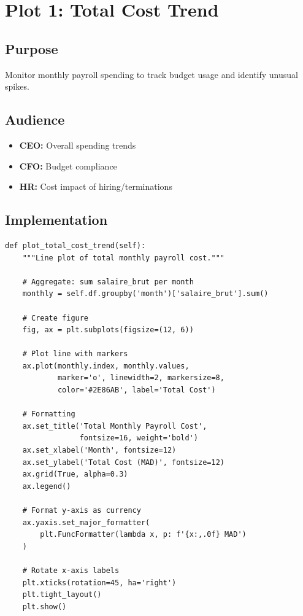 \section{Plot 1: Total Cost Trend}

\subsection{Purpose}
Monitor monthly payroll spending to track budget usage and identify unusual spikes.

\subsection{Audience}
\begin{itemize}
    \item \textbf{CEO:} Overall spending trends
    \item \textbf{CFO:} Budget compliance
    \item \textbf{HR:} Cost impact of hiring/terminations
\end{itemize}

\subsection{Implementation}

\begin{lstlisting}[style=pythonstyle]
def plot_total_cost_trend(self):
    """Line plot of total monthly payroll cost."""
    
    # Aggregate: sum salaire_brut per month
    monthly = self.df.groupby('month')['salaire_brut'].sum()
    
    # Create figure
    fig, ax = plt.subplots(figsize=(12, 6))
    
    # Plot line with markers
    ax.plot(monthly.index, monthly.values, 
            marker='o', linewidth=2, markersize=8,
            color='#2E86AB', label='Total Cost')
    
    # Formatting
    ax.set_title('Total Monthly Payroll Cost', 
                 fontsize=16, weight='bold')
    ax.set_xlabel('Month', fontsize=12)
    ax.set_ylabel('Total Cost (MAD)', fontsize=12)
    ax.grid(True, alpha=0.3)
    ax.legend()
    
    # Format y-axis as currency
    ax.yaxis.set_major_formatter(
        plt.FuncFormatter(lambda x, p: f'{x:,.0f} MAD')
    )
    
    # Rotate x-axis labels
    plt.xticks(rotation=45, ha='right')
    plt.tight_layout()
    plt.show()
\end{lstlisting}

